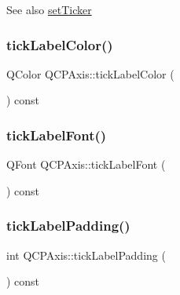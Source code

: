 \begin{DoxySeeAlso}{See also}
\hyperlink{class_q_c_p_axis_a4ee03fcd2c74d05cd1a419b9af5cfbdc}{set\+Ticker} 
\end{DoxySeeAlso}
\mbox{\label{class_q_c_p_axis_a9e21b2326bb2de0b7a8efcd1efc0ce78}} 
\subsubsection{\texorpdfstring{tick\+Label\+Color()}{tickLabelColor()}}
{\footnotesize\ttfamily Q\+Color Q\+C\+P\+Axis\+::tick\+Label\+Color (\begin{DoxyParamCaption}{ }\end{DoxyParamCaption}) const\hspace{0.3cm}{\ttfamily [inline]}}

\mbox{\label{class_q_c_p_axis_a09f339b7125cf1094920f86687b88236}} 
\subsubsection{\texorpdfstring{tick\+Label\+Font()}{tickLabelFont()}}
{\footnotesize\ttfamily Q\+Font Q\+C\+P\+Axis\+::tick\+Label\+Font (\begin{DoxyParamCaption}{ }\end{DoxyParamCaption}) const\hspace{0.3cm}{\ttfamily [inline]}}

\mbox{\label{class_q_c_p_axis_afac7316ca35941e7080f98e0022c1891}} 
\subsubsection{\texorpdfstring{tick\+Label\+Padding()}{tickLabelPadding()}}
{\footnotesize\ttfamily int Q\+C\+P\+Axis\+::tick\+Label\+Padding (\begin{DoxyParamCaption}{ }\end{DoxyParamCaption}) const}

